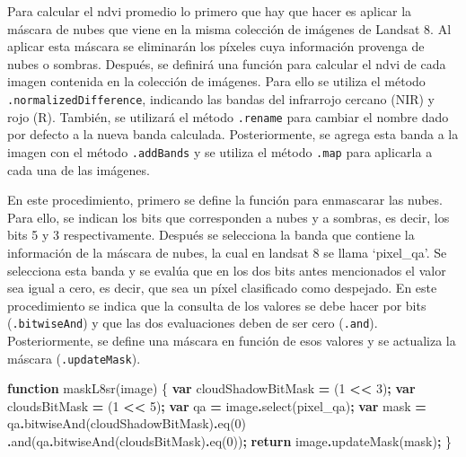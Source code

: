 \documentclass[
  12pt,
  letterpaper,
  twoside]{book}
\newenvironment{Shaded}{\begin{snugshade}}{\end{snugshade}}
\newcommand{\ControlFlowTok}[1]{\textcolor[rgb]{0.13,0.29,0.53}{\textbf{#1}}}
\newcommand{\DecValTok}[1]{\textcolor[rgb]{0.00,0.00,0.81}{#1}}
\newcommand{\FunctionTok}[1]{\textcolor[rgb]{0.00,0.00,0.00}{#1}}
\newcommand{\KeywordTok}[1]{\textcolor[rgb]{0.13,0.29,0.53}{\textbf{#1}}}
\newcommand{\NormalTok}[1]{#1}
\newcommand{\OperatorTok}[1]{\textcolor[rgb]{0.81,0.36,0.00}{\textbf{#1}}}
\newcommand{\StringTok}[1]{\textcolor[rgb]{0.31,0.60,0.02}{#1}}
\begin{document}
Para calcular el ndvi promedio lo primero que hay que hacer es aplicar la máscara de nubes que viene en la misma colección de imágenes de Landsat 8. Al aplicar esta máscara se eliminarán los píxeles cuya información provenga de nubes o sombras. Después, se definirá una función para calcular el ndvi de cada imagen contenida en la colección de imágenes. Para ello se utiliza el método \texttt{.normalizedDifference}, indicando las bandas del infrarrojo cercano (NIR) y rojo (R). También, se utilizará el método \texttt{.rename} para cambiar el nombre dado por defecto a la nueva banda calculada. Posteriormente, se agrega esta banda a la imagen con el método \texttt{.addBands} y se utiliza el método \texttt{.map} para aplicarla a cada una de las imágenes.

En este procedimiento, primero se define la función para enmascarar las nubes. Para ello, se indican los bits que corresponden a nubes y a sombras, es decir, los bits 5 y 3 respectivamente. Después se selecciona la banda que contiene la información de la máscara de nubes, la cual en landsat 8 se llama `pixel\_qa'. Se selecciona esta banda y se evalúa que en los dos bits antes mencionados el valor sea igual a cero, es decir, que sea un píxel clasificado como despejado. En este procedimiento se indica que la consulta de los valores se debe hacer por bits (\texttt{.bitwiseAnd}) y que las dos evaluaciones deben de ser cero (\texttt{.and}). Posteriormente, se define una máscara en función de esos valores y se actualiza la máscara (\texttt{.updateMask}).

\begin{Shaded}
\begin{Highlighting}[]
\KeywordTok{function} \FunctionTok{maskL8sr}\NormalTok{(image) \{}
  \KeywordTok{var}\NormalTok{ cloudShadowBitMask }\OperatorTok{=}\NormalTok{ (}\DecValTok{1} \OperatorTok{\textless{}\textless{}} \DecValTok{3}\NormalTok{)}\OperatorTok{;}
  \KeywordTok{var}\NormalTok{ cloudsBitMask }\OperatorTok{=}\NormalTok{ (}\DecValTok{1} \OperatorTok{\textless{}\textless{}} \DecValTok{5}\NormalTok{)}\OperatorTok{;}
  \KeywordTok{var}\NormalTok{ qa }\OperatorTok{=}\NormalTok{ image}\OperatorTok{.}\FunctionTok{select}\NormalTok{(}\StringTok{\textquotesingle{}pixel\_qa\textquotesingle{}}\NormalTok{)}\OperatorTok{;}
  \KeywordTok{var}\NormalTok{ mask }\OperatorTok{=}\NormalTok{ qa}\OperatorTok{.}\FunctionTok{bitwiseAnd}\NormalTok{(cloudShadowBitMask)}\OperatorTok{.}\FunctionTok{eq}\NormalTok{(}\DecValTok{0}\NormalTok{)}
                 \OperatorTok{.}\FunctionTok{and}\NormalTok{(qa}\OperatorTok{.}\FunctionTok{bitwiseAnd}\NormalTok{(cloudsBitMask)}\OperatorTok{.}\FunctionTok{eq}\NormalTok{(}\DecValTok{0}\NormalTok{))}\OperatorTok{;}
  \ControlFlowTok{return}\NormalTok{ image}\OperatorTok{.}\FunctionTok{updateMask}\NormalTok{(mask)}\OperatorTok{;}
\NormalTok{\}}
\end{Highlighting}
\end{Shaded}
\end{document}
